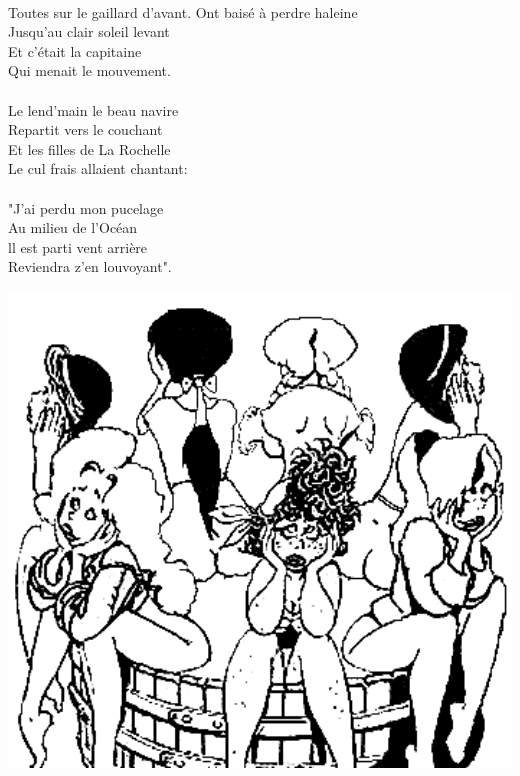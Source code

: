 \\Toutes sur le gaillard d'avant.
\breakpage
Ont baisé à perdre haleine
\\Jusqu'au clair soleil levant ~\bissimple
\\Et c'était la capitaine
\\Qui menait le mouvement.
\\\\Le lend'main le beau navire
\\Repartit vers le couchant ~~~~~~\bissimple
\\Et les filles de La Rochelle
\\Le cul frais allaient chantant:
\\\\"J'ai perdu mon pucelage
\\Au milieu de l'Océan~~~~~~~ \bissimple
\\ll est parti vent arrière
\\Reviendra z'en louvoyant".
\\
\bigskip
\begin{center}
\includegraphics[width=1\textwidth]{images/rochelle.png}
\end{center}

\breakpage